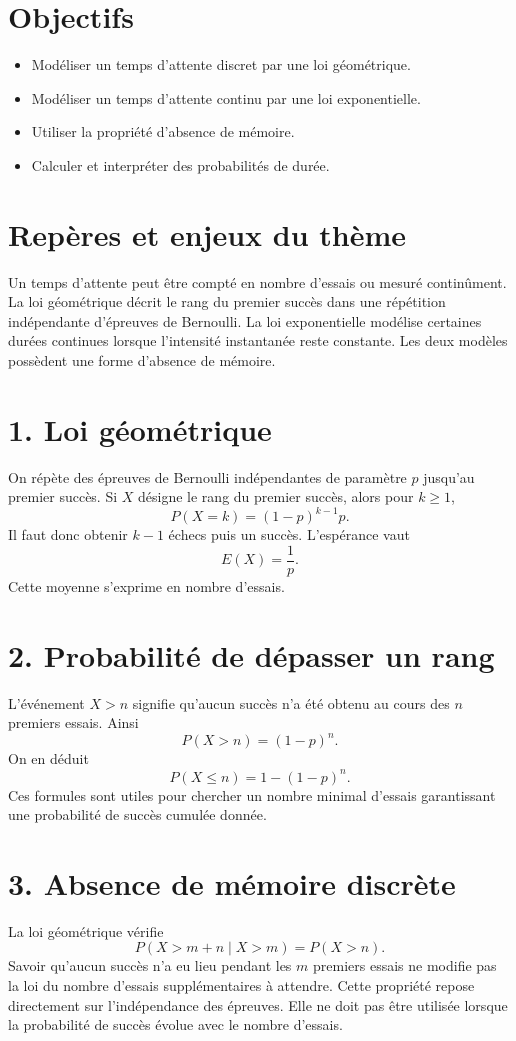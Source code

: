 \section{Objectifs}
\begin{itemize}
\item Modéliser un temps d'attente discret par une loi géométrique.
\item Modéliser un temps d'attente continu par une loi exponentielle.
\item Utiliser la propriété d'absence de mémoire.
\item Calculer et interpréter des probabilités de durée.
\end{itemize}
\section{Repères et enjeux du thème}
Un temps d'attente peut être compté en nombre d'essais ou mesuré continûment. La loi géométrique décrit le rang du premier succès dans une répétition indépendante d'épreuves de Bernoulli. La loi exponentielle modélise certaines durées continues lorsque l'intensité instantanée reste constante. Les deux modèles possèdent une forme d'absence de mémoire.
\section{1. Loi géométrique}
On répète des épreuves de Bernoulli indépendantes de paramètre $p$ jusqu'au premier succès. Si $X$ désigne le rang du premier succès, alors pour $k\geq1$,
\[
P(X=k)=(1-p)^{k-1}p.
\]
Il faut donc obtenir $k-1$ échecs puis un succès. L'espérance vaut
\[
E(X)=\frac1p.
\]
Cette moyenne s'exprime en nombre d'essais.
\section{2. Probabilité de dépasser un rang}
L'événement $X>n$ signifie qu'aucun succès n'a été obtenu au cours des $n$ premiers essais. Ainsi
\[
P(X>n)=(1-p)^n.
\]
On en déduit
\[
P(X\leq n)=1-(1-p)^n.
\]
Ces formules sont utiles pour chercher un nombre minimal d'essais garantissant une probabilité de succès cumulée donnée.
\section{3. Absence de mémoire discrète}
La loi géométrique vérifie
\[
P(X>m+n\mid X>m)=P(X>n).
\]
Savoir qu'aucun succès n'a eu lieu pendant les $m$ premiers essais ne modifie pas la loi du nombre d'essais supplémentaires à attendre. Cette propriété repose directement sur l'indépendance des épreuves.
Elle ne doit pas être utilisée lorsque la probabilité de succès évolue avec le nombre d'essais.
